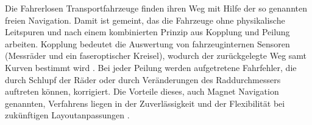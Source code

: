 Die Fahrerlosen Transportfahrzeuge finden ihren Weg mit Hilfe der so genannten freien Navigation. Damit ist gemeint, das die Fahrzeuge ohne physikalische Leitspuren und nach einem kombinierten Prinzip aus Kopplung und Peilung arbeiten. Kopplung bedeutet die Auswertung von fahrzeuginternen Sensoren (Messr\"ader und ein faseroptischer Kreisel), wodurch der zur\"uckgelegte Weg samt Kurven bestimmt wird \cite[S. 36]{Guenther:2011}. Bei jeder Peilung werden aufgetretene Fahrfehler, die durch Schlupf der R\"ader oder durch Ver\"anderungen des Raddurchmessers auftreten k\"onnen, korrigiert. Die Vorteile dieses, auch Magnet Navigation genannten, Verfahrens liegen in der Zuverl\"assigkeit und der Flexibilit\"at bei zuk\"unftigen Layoutanpassungen \cite[S. 36]{Guenther:2011}.


